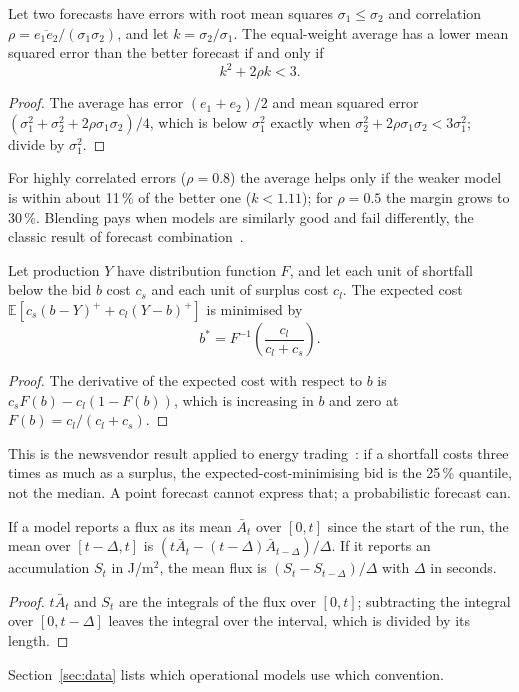 \begin{proposition}
\label{prop:combine}
Let two forecasts have errors with root mean squares $\sigma_1\le\sigma_2$ and correlation $\rho=\overline{e_1e_2}/(\sigma_1\sigma_2)$, and let $k=\sigma_2/\sigma_1$. The equal-weight average has a lower mean squared error than the better forecast if and only if
\begin{equation}
k^2+2\rho k<3 . \label{eq:combine}
\end{equation}
\end{proposition}
\begin{proof}
The average has error $(e_1+e_2)/2$ and mean squared error $(\sigma_1^2+\sigma_2^2+2\rho\sigma_1\sigma_2)/4$, which is below $\sigma_1^2$ exactly when $\sigma_2^2+2\rho\sigma_1\sigma_2<3\sigma_1^2$; divide by $\sigma_1^2$.
\end{proof}
For highly correlated errors ($\rho=0.8$) the average helps only if the weaker model is within about 11\,\% of the better one ($k<1.11$); for $\rho=0.5$ the margin grows to 30\,\%. Blending pays when models are similarly good and fail differently, the classic result of forecast combination~\cite{bates1969combination}.

\begin{proposition}
\label{prop:bid}
Let production $Y$ have distribution function $F$, and let each unit of shortfall below the bid $b$ cost $c_s$ and each unit of surplus cost $c_l$. The expected cost $\mathbb E[c_s(b-Y)^++c_l(Y-b)^+]$ is minimised by
\begin{equation}
b^*=F^{-1}\!\left(\frac{c_l}{c_l+c_s}\right). \label{eq:newsvendor}
\end{equation}
\end{proposition}
\begin{proof}
The derivative of the expected cost with respect to $b$ is $c_sF(b)-c_l(1-F(b))$, which is increasing in $b$ and zero at $F(b)=c_l/(c_l+c_s)$.
\end{proof}
This is the newsvendor result applied to energy trading~\cite{pinson2007trading}: if a shortfall costs three times as much as a surplus, the expected-cost-minimising bid is the 25\,\% quantile, not the median. A point forecast cannot express that; a probabilistic forecast can.

\begin{lemma}
\label{lem:deacc}
If a model reports a flux as its mean $\bar A_t$ over $[0,t]$ since the start of the run, the mean over $[t-\Delta,t]$ is $(t\bar A_t-(t-\Delta)\bar A_{t-\Delta})/\Delta$. If it reports an accumulation $S_t$ in J/m$^2$, the mean flux is $(S_t-S_{t-\Delta})/\Delta$ with $\Delta$ in seconds.
\end{lemma}
\begin{proof}
$t\bar A_t$ and $S_t$ are the integrals of the flux over $[0,t]$; subtracting the integral over $[0,t-\Delta]$ leaves the integral over the interval, which is divided by its length.
\end{proof}
Section~\ref{sec:data} lists which operational models use which convention.

